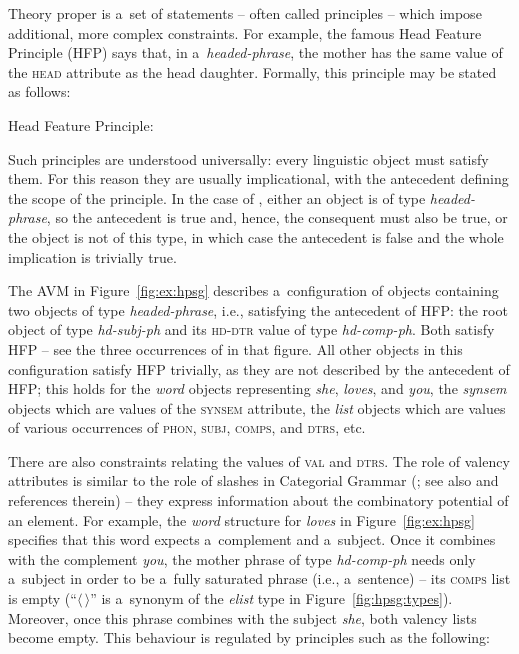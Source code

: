 \documentclass[output=paper,hidelinks]{langscibook}
\begin{document}
Theory proper is a~set of statements -- often called principles -- which impose additional, more complex constraints.  For example, the famous Head Feature Principle (HFP) says that, in a~\textit{headed\hyp{}phrase}, the mother has the same value of the \textsc{head} attribute as the head daughter.  Formally, this principle may be stated as follows:

\ea\label{hfp}Head Feature Principle:\smallskip\\
\z

Such principles are understood universally: every linguistic object must satisfy them.  For this reason they are usually implicational, with the antecedent defining the scope of the principle.  In the case of , either an object is of type \textit{headed\hyp{}phrase}, so the antecedent is true and, hence, the consequent must also be true, or the object is not of this type, in which case the antecedent is false and the whole implication is trivially true.  

The AVM in Figure~\ref{fig:ex:hpsg} describes a~configuration of objects containing two objects of type \textit{headed\hyp{}phrase}, i.e., satisfying the antecedent of HFP\@: the root object of type \textit{hd-subj-ph} and its \textsc{hd-dtr} value of type \textit{hd-comp-ph}.  Both satisfy HFP -- see the three occurrences of  in that figure.  All other objects in this configuration satisfy HFP trivially, as they are not described by the antecedent of HFP; this holds for the \textit{word} objects representing \emph{she}, \emph{loves}, and \emph{you}, the \textit{synsem} objects which are values of the \textsc{synsem} attribute, the \textit{list} objects which are values of various occurrences of \textsc{phon}, \textsc{subj}, \textsc{comps}, and \textsc{dtrs}, etc.

There are also constraints relating the values of \textsc{val} and \textsc{dtrs}.  The role of valency attributes is similar to the role of slashes in Categorial Grammar (\citealt{ajdu:35,lambek1958}; see also \citealt{kubo:20} and references therein) -- they express information about the combinatory potential of an element.  For example, the \textit{word} structure for \emph{loves} in Figure~\ref{fig:ex:hpsg} specifies that this word expects a~complement and a~subject.  Once it combines with the complement \emph{you}, the mother phrase of type \textit{hd-comp-ph} needs only a~subject in order to be a~fully saturated phrase (i.e., a~sentence) -- its \textsc{comps} list is empty (“$\langle\,\rangle$” is a~synonym of the \textit{elist} type in Figure~\ref{fig:hpsg:types}).  Moreover, once this phrase combines with the subject \emph{she}, both valency lists become empty.  This behaviour is regulated by principles such as the following:\pagebreak
\end{document}

